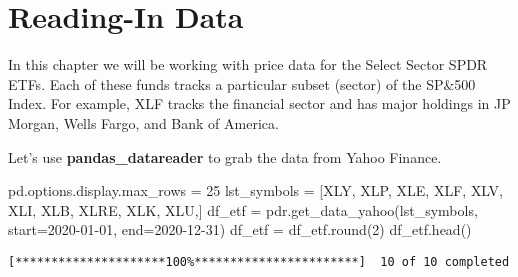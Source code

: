 \documentclass[
  letterpaper,
  DIV=11,
  numbers=noendperiod]{scrreprt}
\newenvironment{Shaded}{\begin{snugshade}}{\end{snugshade}}
\newcommand{\BuiltInTok}[1]{\textcolor[rgb]{0.00,0.23,0.31}{#1}}
\newcommand{\DecValTok}[1]{\textcolor[rgb]{0.68,0.00,0.00}{#1}}
\newcommand{\NormalTok}[1]{\textcolor[rgb]{0.00,0.23,0.31}{#1}}
\newcommand{\OperatorTok}[1]{\textcolor[rgb]{0.37,0.37,0.37}{#1}}
\newcommand{\StringTok}[1]{\textcolor[rgb]{0.13,0.47,0.30}{#1}}
\begin{document}
\hypertarget{reading-in-data-6}{%
\section{Reading-In Data}\label{reading-in-data-6}}

In this chapter we will be working with price data for the Select Sector
SPDR ETFs. Each of these funds tracks a particular subset (sector) of
the SP\&500 Index. For example, XLF tracks the financial sector and has
major holdings in JP Morgan, Wells Fargo, and Bank of America.

Let's use \textbf{pandas\_datareader} to grab the data from Yahoo
Finance.

\begin{Shaded}
\begin{Highlighting}[]
\NormalTok{pd.options.display.max\_rows }\OperatorTok{=} \DecValTok{25}
\NormalTok{lst\_symbols }\OperatorTok{=}\NormalTok{ [}\StringTok{\textquotesingle{}XLY\textquotesingle{}}\NormalTok{, }\StringTok{\textquotesingle{}XLP\textquotesingle{}}\NormalTok{, }\StringTok{\textquotesingle{}XLE\textquotesingle{}}\NormalTok{, }\StringTok{\textquotesingle{}XLF\textquotesingle{}}\NormalTok{, }\StringTok{\textquotesingle{}XLV\textquotesingle{}}\NormalTok{, }\StringTok{\textquotesingle{}XLI\textquotesingle{}}\NormalTok{, }\StringTok{\textquotesingle{}XLB\textquotesingle{}}\NormalTok{, }\StringTok{\textquotesingle{}XLRE\textquotesingle{}}\NormalTok{, }\StringTok{\textquotesingle{}XLK\textquotesingle{}}\NormalTok{, }\StringTok{\textquotesingle{}XLU\textquotesingle{}}\NormalTok{,]}
\NormalTok{df\_etf }\OperatorTok{=}\NormalTok{ pdr.get\_data\_yahoo(lst\_symbols, start}\OperatorTok{=}\StringTok{\textquotesingle{}2020{-}01{-}01\textquotesingle{}}\NormalTok{, end}\OperatorTok{=}\StringTok{\textquotesingle{}2020{-}12{-}31\textquotesingle{}}\NormalTok{)}
\NormalTok{df\_etf }\OperatorTok{=}\NormalTok{ df\_etf.}\BuiltInTok{round}\NormalTok{(}\DecValTok{2}\NormalTok{)}
\NormalTok{df\_etf.head()}
\end{Highlighting}
\end{Shaded}

\begin{verbatim}
[*********************100%***********************]  10 of 10 completed
\end{verbatim}
\end{document}
